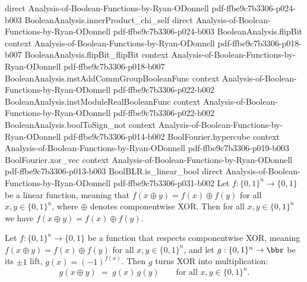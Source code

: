\begin{lemma}
  {direct}
  {Analysis-of-Boolean-Functions-by-Ryan-ODonnell}
  {pdf-ffbe9c7b3306-p024-b003}
\proofstep
  {BooleanAnalysis.innerProduct_chi_self}
  {direct}
  {Analysis-of-Boolean-Functions-by-Ryan-ODonnell}
  {pdf-ffbe9c7b3306-p024-b003}
\proofstep
  {BooleanAnalysis.flipBit}
  {context}
  {Analysis-of-Boolean-Functions-by-Ryan-ODonnell}
  {pdf-ffbe9c7b3306-p018-b007}
\proofstep
  {BooleanAnalysis.flipBit_flipBit}
  {context}
  {Analysis-of-Boolean-Functions-by-Ryan-ODonnell}
  {pdf-ffbe9c7b3306-p018-b007}
\proofstep
  {BooleanAnalysis.instAddCommGroupBooleanFunc}
  {context}
  {Analysis-of-Boolean-Functions-by-Ryan-ODonnell}
  {pdf-ffbe9c7b3306-p022-b002}
\proofstep
  {BooleanAnalysis.instModuleRealBooleanFunc}
  {context}
  {Analysis-of-Boolean-Functions-by-Ryan-ODonnell}
  {pdf-ffbe9c7b3306-p022-b002}
\proofstep
  {BooleanAnalysis.boolToSign_not}
  {context}
  {Analysis-of-Boolean-Functions-by-Ryan-ODonnell}
  {pdf-ffbe9c7b3306-p014-b002}
\proofstep
  {BoolFourier.hypercube}
  {context}
  {Analysis-of-Boolean-Functions-by-Ryan-ODonnell}
  {pdf-ffbe9c7b3306-p019-b003}
\proofstep
  {BoolFourier.xor_vec}
  {context}
  {Analysis-of-Boolean-Functions-by-Ryan-ODonnell}
  {pdf-ffbe9c7b3306-p013-b003}
\proofstep
  {BoolBLR.is_linear_bool}
  {direct}
  {Analysis-of-Boolean-Functions-by-Ryan-ODonnell}
  {pdf-ffbe9c7b3306-p031-b002}
Let $f : \{0,1\}^n \to \{0,1\}$ be a linear function, meaning that $f(x \oplus y) = f(x)
\oplus f(y)$ for all $x, y \in \{0,1\}^n$, where $\oplus$ denotes componentwise XOR.
Then for all $x, y \in \{0,1\}^n$ we have $f(x \oplus y) = f(x) \oplus f(y)$.
\end{lemma}

\begin{lemma}
\label{BoolBLR.BLR_completeness_aux_h_lift_linear}
\leanok
{}
Let $f : \{0,1\}^n \to \{0,1\}$ be a function that respects componentwise XOR, meaning
$f(x \oplus y) = f(x) \oplus f(y)$ for all $x, y \in \{0,1\}^n$, and let $g : \{0,1\}^n
\to \bbr$ be its $\pm 1$ lift, $g(x) = (-1)^{f(x)}$. Then $g$ turns XOR into
multiplication:
\[
  g(x \oplus y) \;=\; g(x)\,g(y) \qquad \text{for all } x, y \in \{0,1\}^n.
\]
\end{lemma}
